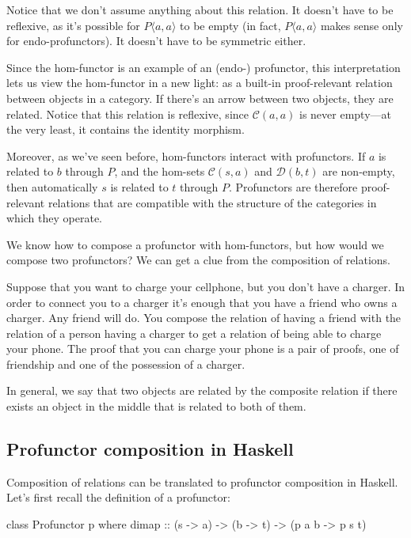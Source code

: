 \documentclass[DaoFP]{subfiles}
\begin{document}
Notice that we don't assume anything about this relation. It doesn't have to be reflexive, as it's possible for $P \langle a, a \rangle$ to be empty (in fact, $P \langle a, a \rangle$ makes sense only for endo-profunctors). It doesn't have to be symmetric either.

Since the hom-functor is an example of an (endo-) profunctor, this interpretation lets us view the hom-functor in a new light: as a built-in proof-relevant relation between objects in a category. If there's an arrow between two objects, they are related. Notice that this relation is reflexive, since $\mathcal{C}(a, a)$ is never empty---at the very least, it contains the identity morphism. 

Moreover, as we've seen before, hom-functors interact with profunctors. If $a$ is related to $b$ through $P$, and the hom-sets $\mathcal{C}(s, a)$ and $\mathcal{D}(b, t)$ are non-empty, then automatically $s$ is related to $t$ through $P$. Profunctors are therefore proof-relevant relations that are compatible with the structure of the categories in which they operate.

We know how to compose a profunctor with hom-functors, but how would we compose two profunctors? We can get a clue from the composition of relations. 

Suppose that you want to charge your cellphone, but you don't have a charger. In order to connect you to a charger it's enough that you have a friend who owns a charger. Any friend will do. You compose the relation of having a friend with the relation of a person having a charger to get a relation of being able to charge your phone. The proof that you can charge your phone is a pair of proofs, one of friendship and one of the possession of a charger. 

In general, we say that two objects are related by the composite relation if there exists an object in the middle that is related to both of them. 

\subsection{Profunctor composition in Haskell}

Composition of relations can be translated to profunctor composition in Haskell. Let's first recall the definition of a profunctor:
\begin{haskell}
class Profunctor p where
  dimap :: (s -> a) -> (b -> t) -> (p a b -> p s t)
\end{haskell}
\end{document}
